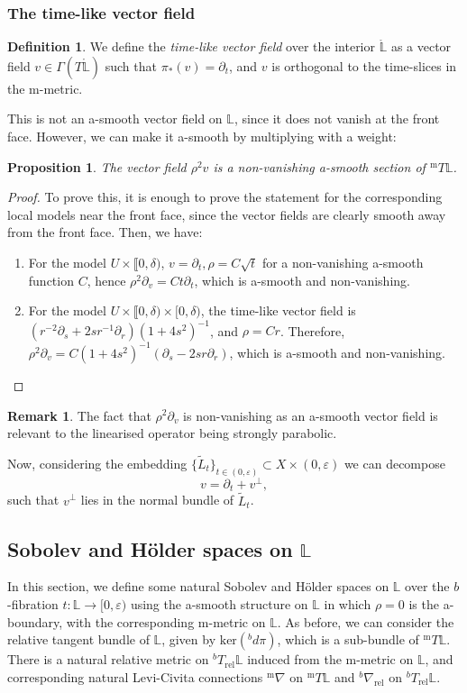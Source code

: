 \documentclass[10pt, a4paper]{article}
\theoremstyle{plain}%
\newtheorem{prop}[theorem]{Proposition}
\theoremstyle{definition}
\newtheorem{defn}[theorem]{Definition}
\newtheorem{rem}[theorem]{Remark}
\numberwithin{figure}{section}
\numberwithin{equation}{section}
\newcommand{\bL}{\mathbb{L}}
\newcommand{\pa}{\partial}
\newcommand{\rt}{\rightarrow}
\newcommand{\ep}{\varepsilon}
\newcommand{\tL}{\widetilde{L}}
\newcommand{\rel}{\mathrm{rel}}
\newcommand{\m}{\mathrm{m}}
\begin{document}
\subsubsection{The time-like vector field}
\begin{defn}We define the \textit{time-like vector field} over the interior $\mathbb{\mathring{L}}$ as a vector field $v\in \Gamma(T\mathring{\bL})$ such that $\pi_*(v)=\pa_t$, and $v$ is orthogonal to the time-slices in the m-metric.
\end{defn}
 This is not an a-smooth vector field on $\bL$, since it does not vanish at the front face. However, we can make it a-smooth by multiplying with a weight:
\begin{prop}
	 The vector field $\rho^2v$ is a non-vanishing a-smooth section of $^{\m}T\bL$. 
\end{prop}
\begin{proof}
	To prove this, it is enough to prove the statement for the corresponding local models near the front face, since the vector fields are clearly smooth away from the front face. Then, we have:
	\begin{enumerate}
		\item For the model $U\times\llbracket 0,\delta)$, $v = \pa_t, \rho = C\sqrt{t}$ for a non-vanishing a-smooth function $C$, hence $\rho^2\pa_v= Ct\pa_t$, which is a-smooth and non-vanishing.
		\item For the model $U\times \llbracket0,\delta)\times[0,\delta)$, the time-like vector field is $(r^{-2}\pa_s+2sr^{-1}\pa_r)(1+4s^2)^{-1}$, and $\rho = Cr$. Therefore, $\rho^2\pa_v=C(1+4s^2)^{-1}(\pa_s-2sr\pa_r)$, which is a-smooth and non-vanishing.
	\end{enumerate}
\end{proof}
\begin{rem}
	The fact that $\rho^2\pa_v$ is non-vanishing as an a-smooth vector field is relevant to the linearised operator being strongly parabolic.
\end{rem}
Now, considering the embedding $\{\tL_t\}_{t\in(0,\ep)}\subset X\times(0,\ep)$ we can decompose 
\begin{equation}\label{eq_vdecomposition}
v=\pa_t+v^\perp,
\end{equation}
such that $v^\perp$ lies in the normal bundle of $\tL_t$. 

\subsection{Sobolev and H\"{o}lder spaces on $\bL$}\label{subsec_sobholspaces}
In this section, we define some natural Sobolev and H\"{o}lder spaces on $\bL$ over the $b$-fibration $t:\bL\rt [0,\ep)$ using the a-smooth structure on $\bL$ in which $\rho=0$ is the a-boundary, with the corresponding m-metric on $\bL$. As before, we can consider the relative tangent bundle of $\bL$, given by $\mathrm{ker}(^bd\pi)$, which is a sub-bundle of $^{\m}T\bL$. There is a natural relative metric on $^bT_\rel\bL$ induced from the m-metric on $\bL$, and corresponding natural Levi-Civita connections $^{\m}\nabla$ on $^{\m}T\bL$ and $^b\nabla_\mathrm{rel}$ on $^bT_\mathrm{rel}\bL$.
\end{document}
